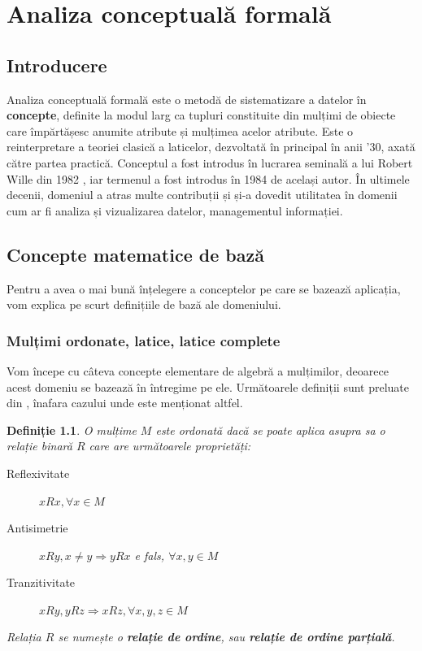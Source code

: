 \documentclass[12pt, a4paper, twoside, romanian]{teza-upb}
\newtheorem{defn}{Definiție}
\begin{document}
\chapter{Analiza conceptuală formală}
\label{chapter:1}
  \section{Introducere}
    Analiza conceptuală formală este o metodă de sistematizare a datelor în \textbf{concepte}, definite la modul larg ca tupluri constituite din mulțimi de obiecte care împărtășesc anumite atribute și mulțimea acelor atribute. Este o reinterpretare a teoriei clasică a laticelor, dezvoltată în principal în anii '30, axată către partea practică. Conceptul a fost introdus în lucrarea seminală a lui Robert Wille din 1982 \cite{wille:1982}, iar termenul a fost introdus în 1984 de același autor. În ultimele decenii, domeniul a atras multe contribuții și și-a dovedit utilitatea în domenii cum ar fi analiza și vizualizarea datelor, managementul informației.
  \section{Concepte matematice de bază}
    Pentru a avea o mai bună înțelegere a conceptelor pe care se bazează aplicația, vom explica pe scurt definițiile de bază ale domeniului.
    \subsection{Mulțimi ordonate, latice, latice complete}
    Vom începe cu câteva concepte elementare de algebră a mulțimilor, deoarece acest domeniu se bazează în întregime pe ele. Următoarele definiții sunt preluate din \cite{Ganter:1997:FCA:550737}, înafara cazului unde este menționat altfel.
    \begin{defn}
      O mulțime $M$ este ordonată dacă se poate aplica asupra sa o relație binară $R$ care are următoarele proprietăți:
      \begin{description}
        \item [Reflexivitate] $xRx, \forall x \in M$
        \item [Antisimetrie] $xRy, x \neq y \Rightarrow yRx$ e fals, $\forall x, y \in M$
        \item [Tranzitivitate] $xRy, yRz \Rightarrow xRz, \forall x, y, z \in M$
      \end{description}
      Relația $R$ se numește o \textbf{relație de ordine}, sau \textbf{relație de ordine parțială}.
    \end{defn}
\end{document}
